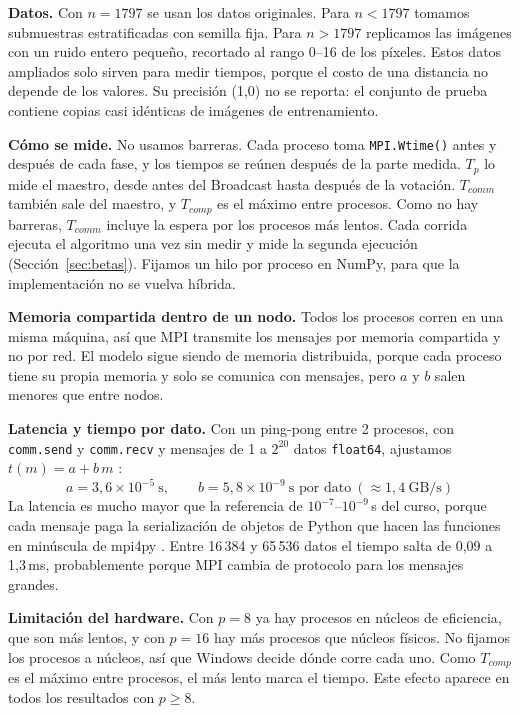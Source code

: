 \documentclass[11pt,a4paper]{article}
\begin{document}
\textbf{Datos.} Con $n=1797$ se usan los datos originales. Para $n<1797$ tomamos submuestras estratificadas con semilla fija. Para $n>1797$ replicamos las imágenes con un ruido entero pequeño, recortado al rango 0--16 de los píxeles. Estos datos ampliados solo sirven para medir tiempos, porque el costo de una distancia no depende de los valores. Su precisión (1,0) no se reporta: el conjunto de prueba contiene copias casi idénticas de imágenes de entrenamiento.

\textbf{Cómo se mide.} No usamos barreras. Cada proceso toma \texttt{MPI.Wtime()} antes y después de cada fase, y los tiempos se reúnen después de la parte medida. $T_p$ lo mide el maestro, desde antes del Broadcast hasta después de la votación. $T_{comm}$ también sale del maestro, y $T_{comp}$ es el máximo entre procesos. Como no hay barreras, $T_{comm}$ incluye la espera por los procesos más lentos. Cada corrida ejecuta el algoritmo una vez sin medir y mide la segunda ejecución (Sección~\ref{sec:betas}). Fijamos un hilo por proceso en NumPy, para que la implementación no se vuelva híbrida.

\textbf{Memoria compartida dentro de un nodo.} Todos los procesos corren en una misma máquina, así que MPI transmite los mensajes por memoria compartida y no por red. El modelo sigue siendo de memoria distribuida, porque cada proceso tiene su propia memoria y solo se comunica con mensajes, pero $a$ y $b$ salen menores que entre nodos.

\textbf{Latencia y tiempo por dato.} Con un ping-pong entre 2 procesos, con \texttt{comm.send} y \texttt{comm.recv} y mensajes de 1 a $2^{20}$ datos \texttt{float64}, ajustamos $t(m)=a+b\,m$ \cite{slides}:
\[
a=3{,}6\times 10^{-5}\ \text{s},\qquad b=5{,}8\times 10^{-9}\ \text{s por dato}\ (\approx 1{,}4\ \text{GB/s})
\]
La latencia es mucho mayor que la referencia de $10^{-7}$--$10^{-9}$\,s del curso, porque cada mensaje paga la serialización de objetos de Python que hacen las funciones en minúscula de mpi4py \cite{mpi4py}. Entre 16\,384 y 65\,536 datos el tiempo salta de 0,09 a 1,3\,ms, probablemente porque MPI cambia de protocolo para los mensajes grandes.

\textbf{Limitación del hardware.} Con $p=8$ ya hay procesos en núcleos de eficiencia, que son más lentos, y con $p=16$ hay más procesos que núcleos físicos. No fijamos los procesos a núcleos, así que Windows decide dónde corre cada uno. Como $T_{comp}$ es el máximo entre procesos, el más lento marca el tiempo. Este efecto aparece en todos los resultados con $p\ge 8$.
\end{document}
